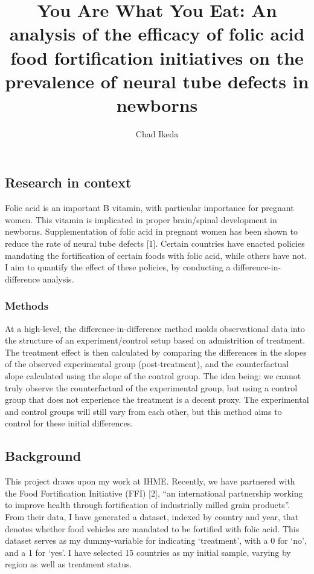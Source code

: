 \documentclass[]{article}
\title{You Are What You Eat: An analysis of the efficacy of folic acid food
fortification initiatives on the prevalence of neural tube defects in
newborns}
\author{Chad Ikeda}
\date{}
\begin{document}
\maketitle

\subsection{Research in context}\label{research-in-context}

Folic acid is an important B vitamin, with particular importance for
pregnant women. This vitamin is implicated in proper brain/spinal
development in newborns. Supplementation of folic acid in pregnant women
has been shown to reduce the rate of neural tube defects {[}1{]}.
Certain countries have enacted policies mandating the fortification of
certain foods with folic acid, while others have not. I aim to quantify
the effect of these policies, by conducting a difference-in-difference
analysis.

\subsubsection{Methods}\label{methods}

At a high-level, the difference-in-difference method molds observational
data into the structure of an experiment/control setup based on
admistrition of treatment. The treatment effect is then calculated by
comparing the differences in the slopes of the observed experimental
group (post-treatment), and the counterfactual slope calculated using
the slope of the control group. The idea being: we cannot truly observe
the counterfactual of the experimental group, but using a control group
that does not experience the treatment is a decent proxy. The
experimental and control groups will still vary from each other, but
this method aims to control for these initial differences.

\subsection{Background}\label{background}

This project draws upon my work at IHME. Recently, we have partnered
with the Food Fortification Initiative (FFI) {[}2{]}, ``an international
partnership working to improve health through fortification of
industrially milled grain products''. From their data, I have generated
a dataset, indexed by country and year, that denotes whether food
vehicles are mandated to be fortified with folic acid. This dataset
serves as my dummy-variable for indicating `treatment', with a 0 for
`no', and a 1 for `yes'. I have selected 15 countries as my initial
sample, varying by region as well as treatment status.
\end{document}
